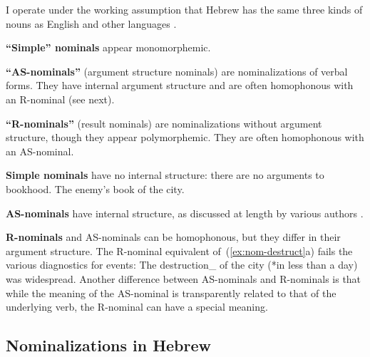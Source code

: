 I operate under the working assumption that Hebrew has the same three kinds of nouns as English and other languages \citep{grimshaw90,alexiadou10b,borer14lingua}.
	\begin{itemize*}
	\item \textbf{``Simple'' nominals} appear monomorphemic.
	\item \textbf{``AS-nominals''} (argument structure nominals) are nominalizations of verbal forms. They have internal argument structure and are often homophonous with an R-nominal (see next).
	\item \textbf{``R-nominals''} (result nominals) are nominalizations without argument structure, though they appear polymorphemic. They are often homophonous with an AS-nominal.
	\end{itemize*}


\textbf{Simple nominals} have no internal structure: there are no arguments to bookhood.
\ex \ljudge{*} The enemy's book of the city.
\xe	


\textbf{AS-nominals} have internal structure, as discussed at length by various authors \citep{chomsky70,grimshaw90,marantz97,harley09n,alexiadou10b,borer13oup}. 

\textbf{R-nominals} and AS-nominals can be homophonous, but they differ in their argument structure. The R-nominal equivalent of~(\ref{ex:nom-destruct}a) fails the various diagnostics for events:
\ex The destruction_{} of the city (*in less than a day) was widespread.
\xe
Another difference between AS-nominals and R-nominals is that while the meaning of the AS-nominal is transparently related to that of the underlying verb, the R-nominal can have a special meaning. 


	\subsection{Nominalizations in Hebrew}
	
